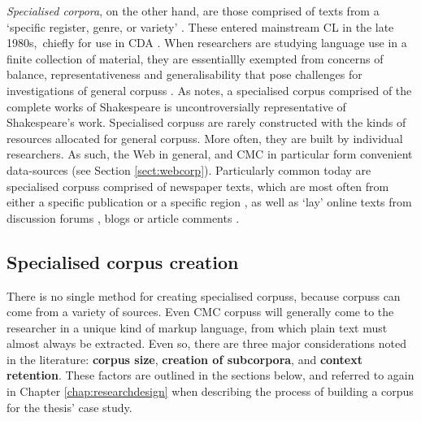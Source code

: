 \emph{Specialised corpora}, on the other hand, are those comprised of texts from a `specific register, genre, or variety' \cite{sinclair_preface_2001}. These entered mainstream \gls{CL} in the late 1980s,~chiefly for use in \gls{CDA} \cite[see][]{hardt-mautner_only_1995}. When researchers are studying language use in a finite collection of material, they are essentiallly exempted from concerns of balance, representativeness and generalisability that pose challenges for investigations of general \glspl{corpus} \cite{hoey_lexical_2005}. As \textcite{baker_sociolinguistics_2010} notes, a specialised \gls{corpus} comprised of the complete works of Shakespeare is uncontroversially representative of Shakespeare's work. Specialised \glspl{corpus} are rarely constructed with the kinds of resources allocated for general \glspl{corpus}. More often, they are built by individual researchers. As such, the Web in general, and \gls{CMC} in particular form convenient data\hyp{}sources (see Section \ref{sect:webcorp}). Particularly common today are specialised \glspl{corpus} comprised of newspaper texts, which are most often from either a specific publication or a specific region \cite[e.g.][]{caldas-coulthard_curvy_2010}, as well as `lay' online texts from discussion forums \cite[e.g.][]{lukac_down_2011}, blogs \cite[e.g][]{ptaszynski_annotating_2012} or article comments \cite[e.g.][]{prentice_using_2010}.

\subsection{Specialised corpus creation} \label{sect:ideals}

There is no single method for creating specialised \glspl{corpus}, because \glspl{corpus} can come from a variety of sources. Even \gls{CMC} \glspl{corpus} will generally come to the researcher in a unique kind of markup language, from which plain text must almost always be extracted. Even so, there are three major considerations noted in the literature: \textbf{corpus size}, \textbf{creation of subcorpora}, and \textbf{context retention}. These factors are outlined in the sections below, and referred to again in Chapter \ref{chap:researchdesign} when describing the process of building a \gls{corpus} for the thesis' case study.

